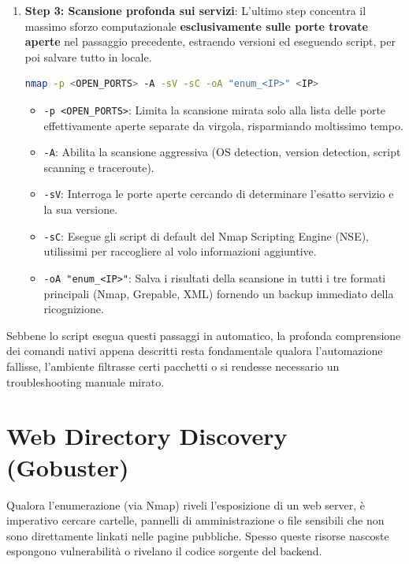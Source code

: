\documentclass[12pt,a4paper]{report}
\begin{document}
\begin{enumerate}
		\item \textbf{Step 3: Scansione profonda sui servizi}: L'ultimo step concentra il massimo sforzo computazionale \textbf{esclusivamente sulle porte trovate aperte} nel passaggio precedente, estraendo versioni ed eseguendo script, per poi salvare tutto in locale.
		\begin{lstlisting}[language=bash]
			nmap -p <OPEN_PORTS> -A -sV -sC -oA "enum_<IP>" <IP>
		\end{lstlisting}
		\begin{itemize}
			\item \texttt{-p <OPEN\_PORTS>}: Limita la scansione mirata solo alla lista delle porte effettivamente aperte separate da virgola, risparmiando moltissimo tempo.
			\item \texttt{-A}: Abilita la scansione aggressiva (OS detection, version detection, script scanning e traceroute).
			\item \texttt{-sV}: Interroga le porte aperte cercando di determinare l'esatto servizio e la sua versione.
			\item \texttt{-sC}: Esegue gli script di default del Nmap Scripting Engine (NSE), utilissimi per raccogliere al volo informazioni aggiuntive.
			\item \texttt{-oA "enum\_<IP>"}: Salva i risultati della scansione in tutti i tre formati principali (Nmap, Grepable, XML) fornendo un backup immediato della ricognizione.
		\end{itemize}
	\end{enumerate}
	
	\begin{nota}
		Sebbene lo script esegua questi passaggi in automatico, la profonda comprensione dei comandi nativi appena descritti resta fondamentale qualora l'automazione fallisse, l'ambiente filtrasse certi pacchetti o si rendesse necessario un troubleshooting manuale mirato.
	\end{nota}
	
	\section{Web Directory Discovery (Gobuster)}
	
	Qualora l'enumerazione (via Nmap) riveli l'esposizione di un web server, è imperativo cercare cartelle, pannelli di amministrazione o file sensibili che non sono direttamente linkati nelle pagine pubbliche. Spesso queste risorse nascoste espongono vulnerabilità o rivelano il codice sorgente del backend.
	
\end{document}
